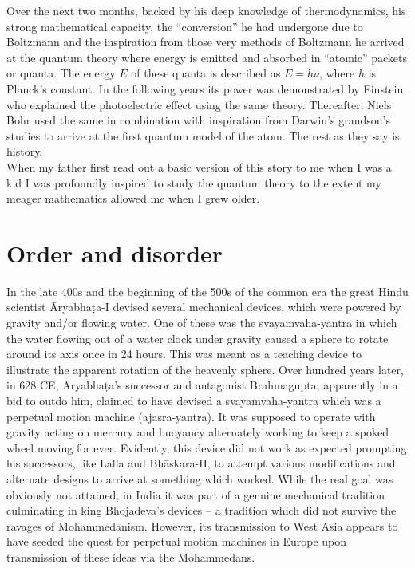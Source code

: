 \documentclass[11pt]{article} %
\numberwithin{equation}{section}
\begin{document}
Over the next two months, backed by his deep knowledge of thermodynamics, his strong mathematical capacity, the “conversion” he had undergone due to Boltzmann and the inspiration from those very methods of Boltzmann he arrived at the quantum theory where energy is emitted and absorbed in “atomic” packets or quanta. The energy $E$ of these quanta is described as $E=h\nu$, where $h$ is Planck’s constant. In the following years its power was demonstrated by Einstein who explained the photoelectric effect using the same theory. Thereafter, Niels Bohr used the same in combination with inspiration from Darwin’s grandson’s studies to arrive at the first quantum model of the atom. The rest as they say is history.\\

When my father first read out a basic version of this story to me when I was a kid I was profoundly inspired to study the quantum theory to the extent my meager mathematics allowed me when I grew older.
 
 \section{Order and disorder}
In the late 400s and the beginning of the 500s of the common era the great Hindu scientist Āryabhaṭa-I devised several mechanical devices, which were powered by gravity and/or flowing water. One of these was the svayamvaha-yantra in which the water flowing out of a water clock under gravity caused a sphere to rotate around its axis once in 24 hours. This was meant as a teaching device to illustrate the apparent rotation of the heavenly sphere. Over hundred years later, in 628 CE, Āryabhaṭa’s successor and antagonist Brahmagupta, apparently in a bid to outdo him, claimed to have devised a svayamvaha-yantra which was a perpetual motion machine (ajasra-yantra). It was supposed to operate with gravity acting on mercury and buoyancy alternately working to keep a spoked wheel moving for ever. Evidently, this device did not work as expected prompting his successors, like Lalla and Bhāskara-II, to attempt various modifications and alternate designs to arrive at something which worked. While the real goal was obviously not attained, in India it was part of a genuine mechanical tradition culminating in king Bhojadeva’s devices -- a tradition which did not survive the ravages of Mohammedanism. However, its transmission to West Asia appears to have seeded the quest for perpetual motion machines in Europe upon transmission of these ideas via the Mohammedans.\\
\end{document}

